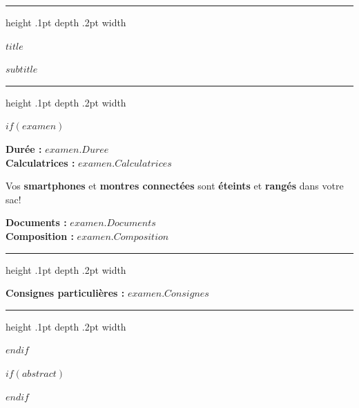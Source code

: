 \medskip

\hrule height .1pt depth .2pt width \textwidth

\begin{center}
\bigskip
\textbf{\sffamily\Large $title$} 

\vspace{1pt}

\textbf{\sffamily\large $subtitle$}
\medskip
\end{center}
\medskip
\hrule height .1pt depth .2pt width \textwidth
\medskip

$if(examen)$

\begin{minipage}[t]{.5\textwidth}
\flushleft
\textbf{\textcolor{gsi_violet}{Durée :}} $examen.Duree$ \\[2pt]
\textbf{\textcolor{gsi_violet}{Calculatrices :}} $examen.Calculatrices$ \\[2pt] 
\end{minipage}
\hfill
\begin{minipage}[t]{.49\textwidth}
\flushright
Vos \textbf{smartphones} et \textbf{montres connectées} sont \textbf{éteints} et \textbf{rangés} dans votre sac!
\end{minipage}

\textbf{\textcolor{gsi_violet}{Documents :}} $examen.Documents$ \\[2pt] 
\textbf{\textcolor{gsi_violet}{Composition :}} $examen.Composition$ \\[2pt] 


\hrule height .1pt depth .2pt width \textwidth

\medskip
\textbf{\textcolor{gsi_violet}{Consignes particulières :}} $examen.Consignes$ 
\bigskip

\hrule height .1pt depth .2pt width \textwidth

\bigskip

$endif$


$if(abstract)$
\begin{abstract}
$abstract$
\end{abstract}
$endif$

